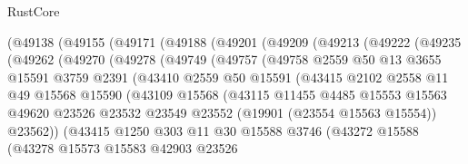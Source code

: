 \begin{lexlean}{RustCore}
\begin{coremodule}
      (@49138
        (@49155
          (@49171
            (@49188
              (@49201
                (@49209
                  (@49213
                    (@49222
                      (@49235
                        (@49262
                          (@49270
                            (@49278
                              (@49749
                                (@49757
                                  (@49758
                                    @2559
                                    @50
                                    @13
                                    @3655
                                    @15591
                                    @3759
                                    @2391
                                    (@43410
                                      @2559
                                      @50
                                      @15591
                                      (@43415
                                        @2102
                                        @2558
                                        @11
                                        @49
                                        @15568
                                        @15590
                                        (@43109
                                          @15568
                                          (@43115
                                            @11455
                                            @4485
                                            @15553
                                            @15563
                                            @49620
                                            @23526
                                            @23532
                                            @23549
                                            @23552
                                            (@19901 (@23554 @15563 @15554))
                                            @23562))
                                        (@43415
                                          @1250
                                          @303
                                          @11
                                          @30
                                          @15588
                                          @3746
                                          (@43272
                                            @15588
                                            (@43278
                                              @15573
                                              @15583
                                              @42903
                                              @23526

\end{coremodule}
\end{lexlean}
